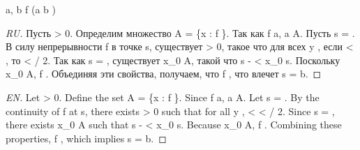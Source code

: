 

\begin{theorem}
\forall a, b \colon \RealNumbers \quad \forall f \colon {} \to \RealNumbers \quad (a \leq b \land {}) \implies {}
\end{theorem}

\begin{proof}[RU]
Пусть \varepsilon > 0. Определим множество A = \{x \in {} : f  \varepsilon{} \}. Так как f  a,  a \in A. Пусть s = . В силу непрерывности f в точке s, существует \delta > 0, такое что для всех y \in {}, если  < \delta, то  < \varepsilon / 2. Так как s = , существует x_0 \in A, такой что s - \delta < x_0 \leq s. Поскольку x_0 \in A, f  \varepsilon{} . Объединяя эти свойства, получаем, что f  \varepsilon{} , что влечет s = b.
\end{proof}

\begin{proof}[EN]
Let \varepsilon > 0. Define the set A = \{x \in {} : f  \varepsilon{} \}. Since f  a,  a \in A. Let s = . By the continuity of f at s, there exists \delta > 0 such that for all y \in {},  < \delta \implies {} < \varepsilon / 2. Since s = , there exists x_0 \in A such that s - \delta < x_0 \leq s. Because x_0 \in A, f  \varepsilon{} . Combining these properties, f  \varepsilon{} , which implies s = b.
\end{proof}